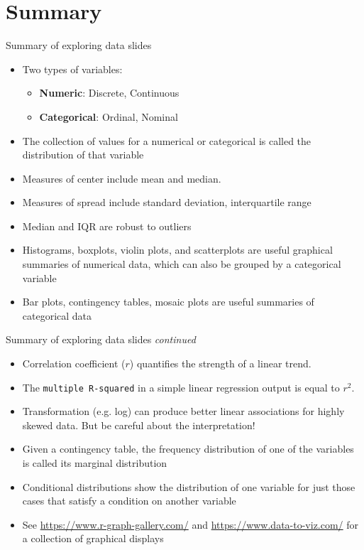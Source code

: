 \documentclass[10pt,handout]{beamer}\usepackage[]{graphicx}\usepackage[]{color}
\begin{document}
\section{Summary}

\begin{frame}{Summary of exploring data slides} 
	
\begin{itemize}
	\item Two types of variables:
	\begin{itemize}
		\item \textbf{Numeric}: Discrete, Continuous
		\item \textbf{Categorical}: Ordinal, Nominal
	\end{itemize}
\pause
\item The collection of values for a numerical or categorical is called the distribution of that variable
\pause
\item Measures of center include mean and median. 
\item Measures of spread include standard deviation, interquartile range
\item Median and IQR are robust to outliers
\pause
\item Histograms, boxplots, violin plots, and scatterplots are useful graphical summaries of numerical data, which can also be grouped by a categorical variable
\item Bar plots, contingency tables, mosaic plots are useful summaries of categorical data
\end{itemize}
\end{frame}

\begin{frame}{Summary of exploring data slides \textit{continued}} 
	
	\begin{itemize}
		\item Correlation coefficient ($r$) quantifies the strength of a linear trend. 
		\item The \texttt{multiple R-squared} in a simple linear regression output is equal to $r^2$. 
		\item Transformation (e.g. log) can produce better linear associations for highly skewed data. But be careful about the interpretation!
		\pause
		\item Given a contingency table, the frequency distribution of one of the variables is called its marginal distribution
		\item Conditional distributions show the distribution of one variable for just those cases that satisfy a condition on another variable
		\item See \url{https://www.r-graph-gallery.com/} and \url{https://www.data-to-viz.com/} for a collection of graphical displays
	\end{itemize}
\end{frame}
\end{document}
